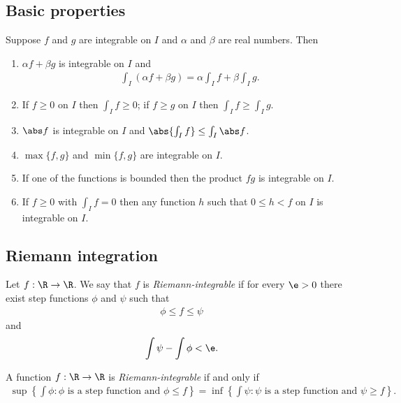 \documentclass{article}
\begin{document}
\subsection{Basic properties}

\begin{theorem}[Notes 4.2]
    Suppose $f$ and $g$ are integrable on $I$ and $\alpha$ and $\beta$ are real numbers. Then
    \begin{enumerate}
        \item $\alpha f + \beta g$ is integrable on $I$ and \begin{align*}
                  \int_I (\alpha f + \beta g) = \alpha \int_I f + \beta \int_I g.
              \end{align*}
        \item If $f\geq 0$ on $I$ then $\int_I f \geq 0$; if $f\geq g$ on $I$ then $\int_I f\geq \int_I g$.
        \item $\abs f$ is integrable on $I$ and $\abs{\int_I f}\leq \int_I \abs f$.
        \item $\max\{f,g\}$ and $\min\{f,g\}$ are integrable on $I$.
        \item If one of the functions is bounded then the product $fg$ is integrable on $I$.
        \item If $f\geq 0$ with $\int_I f = 0$ then any function $h$ such that $0\leq h<f$ on $I$ is integrable on $I$.
    \end{enumerate}
\end{theorem}

\subsection{Riemann integration}

\begin{definition}[Notes 4.4]
    Let $f:\R\to\R$. We say that $f$ is \emph{Riemann-integrable} if for every
    $\e>0$ there exist step functions $\phi$ and $\psi$ such that
    \begin{align*}
        \phi \leq f \leq \psi
    \end{align*}
    and
    \begin{align*}
        \int \psi - \int \phi < \e.
    \end{align*}
\end{definition}

\begin{theorem}[Notes 4.5]
    A function $f:\R\to\R$ is \emph{Riemann-integrable} if and only if
    \begin{align*}
        \sup\left\lbrace\int\phi : \phi\text{ is a step function and }\phi\leq f\right\rbrace
        = \inf\left\lbrace\int\psi : \psi\text{ is a step function and }\psi \geq f\right\rbrace.
    \end{align*}
\end{theorem}
\end{document}
